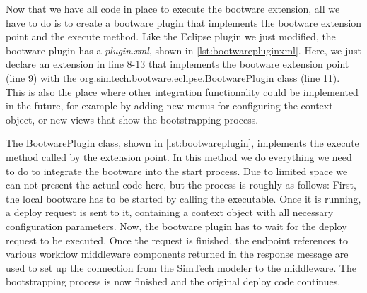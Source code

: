 
Now that we have all code in place to execute the bootware extension, all we have to do is to create a bootware plugin that implements the bootware extension point and the execute method.
Like the Eclipse plugin we just modified, the bootware plugin has a \textit{plugin.xml}, shown in \autoref{lst:bootwarepluginxml}.
Here, we just declare an extension in line 8-13 that implements the bootware extension point (line 9) with the org.simtech.bootware.eclipse.BootwarePlugin class (line 11).
This is also the place where other integration functionality could be implemented in the future, for example by adding new menus for configuring the context object, or new views that show the bootstrapping process.

\vspace*{\baselineskip}

The BootwarePlugin class, shown in \autoref{lst:bootwareplugin}, implements the execute method called by the extension point.
In this method we do everything we need to do to integrate the bootware into the start process.
Due to limited space we can not present the actual code here, but the process is roughly as follows:
First, the local bootware has to be started by calling the executable.
Once it is running, a deploy request is sent to it, containing a context object with all necessary configuration parameters.
Now, the bootware plugin has to wait for the deploy request to be executed.
Once the request is finished, the endpoint references to various workflow middleware components returned in the response message are used to set up the connection from the SimTech modeler to the middleware.
The bootstrapping process is now finished and the original deploy code continues.

\vspace*{\baselineskip}
